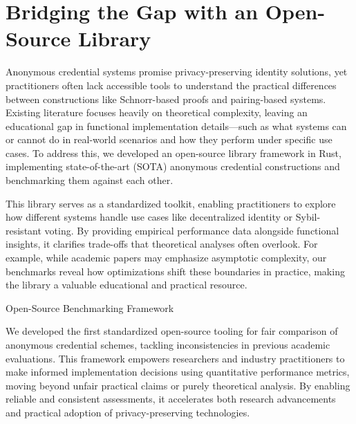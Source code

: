 \section{Bridging the Gap with an Open-Source Library}

Anonymous credential systems promise privacy-preserving identity solutions, yet practitioners often lack accessible tools to understand the practical differences between constructions like Schnorr-based proofs and pairing-based systems. Existing literature focuses heavily on theoretical complexity, leaving an educational gap in functional implementation details—such as what systems can or cannot do in real-world scenarios and how they perform under specific use cases. To address this, we developed an open-source library framework in Rust, implementing state-of-the-art (SOTA) anonymous credential constructions and benchmarking them against each other.

This library serves as a standardized toolkit, enabling practitioners to explore how different systems handle use cases like decentralized identity or Sybil-resistant voting. By providing empirical performance data alongside functional insights, it clarifies trade-offs that theoretical analyses often overlook. For example, while academic papers may emphasize asymptotic complexity, our benchmarks reveal how optimizations shift these boundaries in practice, making the library a valuable educational and practical resource.

Open-Source Benchmarking Framework

We developed the first standardized open-source tooling for fair comparison of anonymous credential schemes, tackling inconsistencies in previous academic evaluations. This framework empowers researchers and industry practitioners to make informed implementation decisions using quantitative performance metrics, moving beyond unfair practical claims or purely theoretical analysis. By enabling reliable and consistent assessments, it accelerates both research advancements and practical adoption of privacy-preserving technologies.































